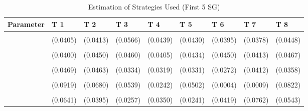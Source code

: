 \begin{table}[!h]
\centering
\caption{Estimation of Strategies Used (First 5 SG)}
\centering
\begin{tabular}[t]{lllllllll}
\toprule
Parameter & T 1 & T 2 & T 3 & T 4 & T 5 & T 6 & T 7 & T 8\\
\midrule
\cellcolor{gray!10}{gamma} & \cellcolor{gray!10}{0.6704***} & \cellcolor{gray!10}{0.6730***} & \cellcolor{gray!10}{0.8479***} & \cellcolor{gray!10}{0.7911***} & \cellcolor{gray!10}{0.7095***} & \cellcolor{gray!10}{0.7261***} & \cellcolor{gray!10}{0.6722***} & \cellcolor{gray!10}{0.7386***}\\
 & (0.0405) & (0.0413) & (0.0566) & (0.0439) & (0.0430) & (0.0395) & (0.0378) & (0.0448)\\
\cellcolor{gray!10}{AD} & \cellcolor{gray!10}{0.3879***} & \cellcolor{gray!10}{0.3596***} & \cellcolor{gray!10}{0.7171***} & \cellcolor{gray!10}{0.6731***} & \cellcolor{gray!10}{0.6733***} & \cellcolor{gray!10}{0.7568***} & \cellcolor{gray!10}{0.3372***} & \cellcolor{gray!10}{0.3475***}\\
 & (0.0400) & (0.0450) & (0.0460) & (0.0405) & (0.0434) & (0.0450) & (0.0413) & (0.0467)\\
\cellcolor{gray!10}{AC} & \cellcolor{gray!10}{0.1495**} & \cellcolor{gray!10}{0.2014***} & \cellcolor{gray!10}{0.1740***} & \cellcolor{gray!10}{0.1599***} & \cellcolor{gray!10}{0.1404***} & \cellcolor{gray!10}{0.0987***} & \cellcolor{gray!10}{0.1942***} & \cellcolor{gray!10}{0.1939***}\\
\addlinespace
 & (0.0469) & (0.0463) & (0.0334) & (0.0319) & (0.0331) & (0.0272) & (0.0412) & (0.0358)\\
\cellcolor{gray!10}{G} & \cellcolor{gray!10}{0.1647} & \cellcolor{gray!10}{0.1228} & \cellcolor{gray!10}{0.0844} & \cellcolor{gray!10}{0.0164} & \cellcolor{gray!10}{0.0663} & \cellcolor{gray!10}{0.0000} & \cellcolor{gray!10}{0.0000} & \cellcolor{gray!10}{0.1866*}\\
 & (0.0919) & (0.0680) & (0.0539) & (0.0242) & (0.0502) & (0.0004) & (0.0009) & (0.0822)\\
\cellcolor{gray!10}{TFT} & \cellcolor{gray!10}{0.1703**} & \cellcolor{gray!10}{0.0589} & \cellcolor{gray!10}{0.0068} & \cellcolor{gray!10}{0.1007**} & \cellcolor{gray!10}{0.0159} & \cellcolor{gray!10}{0.0654} & \cellcolor{gray!10}{0.2197**} & \cellcolor{gray!10}{0.1249*}\\
 & (0.0641) & (0.0395) & (0.0257) & (0.0350) & (0.0241) & (0.0419) & (0.0762) & (0.0543)\\

\end{tabular}
\end{table}
